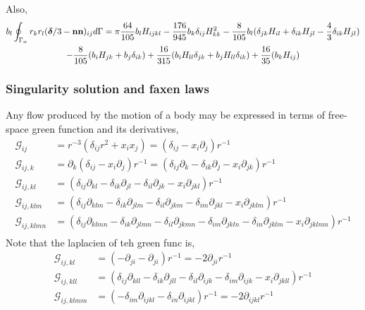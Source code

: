 Also, 
\begin{multline}
    b_l \oint_{\Gamma_{\alpha}}  r_kr_l(\bm\delta/3 - \textbf{nn})_{ij} d\Gamma
    =
    \pi\frac{64}{105}b_l H_{ijkl}
    - \frac{176}{945}b_k \delta_{ij} H_{kk}^2
    - \frac{8}{105}b_l (\delta_{jk} H_{il}+\delta_{ik} H_{jl}-\frac{4}{3}\delta_{ik} H_{jl})\\
    - \frac{8}{105}(b_i H_{jk}+ b_j\delta_{ik})
    +\frac{16}{315}(b_i H_{ll}\delta_{jk}+b_j H_{ll}\delta_{ik} ) 
    +\frac{16}{35}(b_k H_{ij}) 
\end{multline}

\subsubsection{Singularity solution and faxen laws}
Any flow produced by the motion of a body may be expressed in terms of free-space green function and its derivatives,
\begin{align}
    \mathcal{G}_{ij}
    &=
    r^{-3}(\delta_{ij} r^2 + x_ix_j)
    =
    (\delta_{ij} - x_i \partial_j )r^{-1}\\
    \mathcal{G}_{ij,k}
    &=
    \partial_k (\delta_{ij} - x_i \partial_j )r^{-1}
    =(\delta_{ij}\partial_k  
    - \delta_{ik} \partial_j  
    - x_i \partial_{jk} )r^{-1}\\
    \mathcal{G}_{ij,kl}
    &=(
        \delta_{ij} \partial_{kl} 
    - \delta_{ik} \partial_{jl}  
    - \delta_{il} \partial_{jk}
    - x_i \partial_{jkl}
    )r^{-1}\\
    \mathcal{G}_{ij,klm}
    &=(
        \delta_{ij} \partial_{klm} 
    - \delta_{ik} \partial_{jlm}  
    - \delta_{il} \partial_{jkm}
    - \delta_{im} \partial_{jkl}
    - x_i \partial_{jklm}
    )r^{-1}\\
    \mathcal{G}_{ij,klmn}
    &=(
    \delta_{ij} \partial_{klmn} 
    - \delta_{ik} \partial_{jlmn}  
    - \delta_{il} \partial_{jkmn}
    - \delta_{im} \partial_{jkln}
    - \delta_{in} \partial_{jklm}
    - x_i \partial_{jklmn}
    )r^{-1}\\
\end{align}
Note that the laplacien of teh green func is, 
\begin{align}
    \mathcal{G}_{ij,kl}
    &=(
    -  \partial_{ji}  
    - \partial_{ji}
    )r^{-1}
    = -2 \partial_{ji}r^{-1}\\
    \mathcal{G}_{ij,kll}
    &=(
        \delta_{ij} \partial_{kll} 
    - \delta_{ik} \partial_{jll}  
    - \delta_{il} \partial_{ijk}
    - \delta_{im} \partial_{ijk}
    - x_i \partial_{jkll}
    )r^{-1}\\
    \mathcal{G}_{ij,klmm}
    &=(
    - \delta_{im} \partial_{ijkl}
    - \delta_{in} \partial_{ijkl}
    )r^{-1}
    = -2 \partial_{ijkl}r^{-1}
\end{align}

